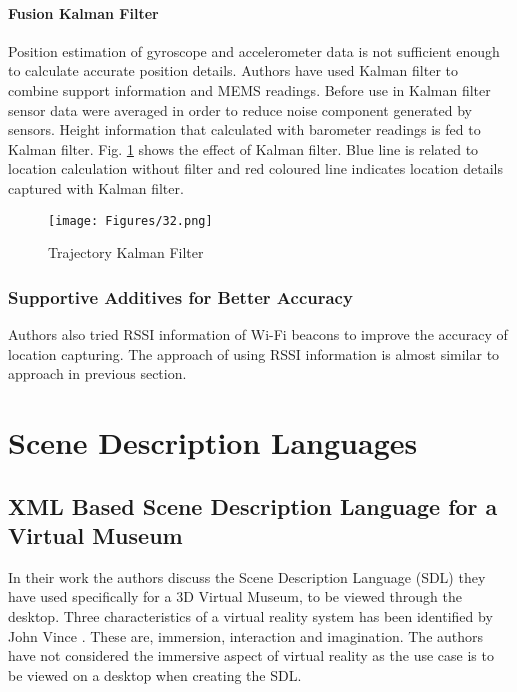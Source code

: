 \paragraph{\textbf{Fusion Kalman Filter}}
Position estimation of gyroscope and accelerometer data is not sufficient enough to calculate accurate position details. Authors have used Kalman filter to combine support information and MEMS readings. Before use in Kalman filter sensor data were averaged in order to reduce noise component generated by sensors. Height information that calculated with barometer readings is fed to Kalman filter. Fig. \ref{fig2_kalman_filter} shows the effect of Kalman filter. Blue line is related to location calculation without filter and red coloured line indicates location details captured with Kalman filter.

\begin{figure}[htbp]
\begin{center}
\texttt{[image: Figures/32.png]}
\caption{Trajectory Kalman Filter}
\label{fig2_kalman_filter}
\end{center}
\end{figure}

\subsubsection{Supportive Additives for Better Accuracy}
Authors also tried RSSI information of Wi-Fi beacons to improve the accuracy of location capturing. The approach of using RSSI information is almost similar to approach in previous section.

\section{Scene Description Languages}

\subsection{XML Based Scene Description Language for a Virtual Museum}
In their work \cite{Lu2008} the authors discuss the Scene Description Language (SDL) they have used specifically for a 3D Virtual Museum, to be viewed through the desktop.
Three characteristics of a virtual reality system has been identified by John Vince \cite{Vince95}. These are, immersion, interaction and imagination. The authors have not considered the immersive aspect of virtual reality as the use case is to be viewed on a desktop when creating the SDL.

